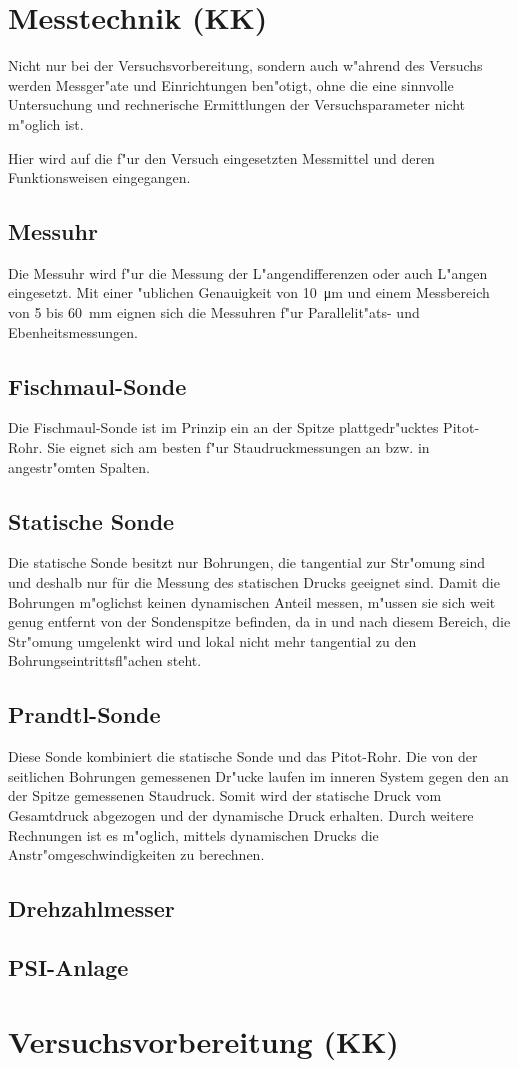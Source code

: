 \section{Messtechnik (KK)}
Nicht nur bei der Versuchsvorbereitung, sondern auch w"ahrend des Versuchs werden Messger"ate und Einrichtungen ben"otigt, ohne die eine sinnvolle Untersuchung und rechnerische Ermittlungen der Versuchsparameter nicht m"oglich ist.

Hier wird auf die f"ur den Versuch eingesetzten Messmittel und deren Funktionsweisen eingegangen.

\subsection{Messuhr}
Die Messuhr wird f"ur die Messung der L"angendifferenzen oder auch L"angen eingesetzt. Mit einer "ublichen Genauigkeit von \SI{10}{\micro\meter} und einem Messbereich von 5 bis \SI{60}{\milli\meter} eignen sich die Messuhren f"ur Parallelit"ats- und Ebenheitsmessungen.

\subsection{Fischmaul-Sonde}
Die Fischmaul-Sonde ist im Prinzip ein an der Spitze plattgedr"ucktes Pitot-Rohr. Sie eignet sich am besten f"ur Staudruckmessungen an bzw. in angestr"omten Spalten.

\subsection{Statische Sonde}
Die statische Sonde besitzt nur Bohrungen, die tangential zur Str"omung sind und deshalb nur für die Messung des statischen Drucks geeignet sind.
Damit die Bohrungen m"oglichst keinen dynamischen Anteil messen, m"ussen sie sich weit genug entfernt von der Sondenspitze befinden, da in und nach diesem Bereich, die Str"omung umgelenkt wird und lokal nicht mehr tangential zu den Bohrungseintrittsfl"achen steht.

\subsection{Prandtl-Sonde}
Diese Sonde kombiniert die statische Sonde und das Pitot-Rohr.
Die von der seitlichen Bohrungen gemessenen Dr"ucke laufen im inneren System gegen den an der Spitze gemessenen Staudruck.
Somit wird der statische Druck vom Gesamtdruck abgezogen und der dynamische Druck erhalten. Durch weitere Rechnungen ist es m"oglich, mittels dynamischen Drucks die Anstr"omgeschwindigkeiten zu berechnen.

\subsection{Drehzahlmesser}

\subsection{PSI-Anlage}

\section{Versuchsvorbereitung (KK)}

